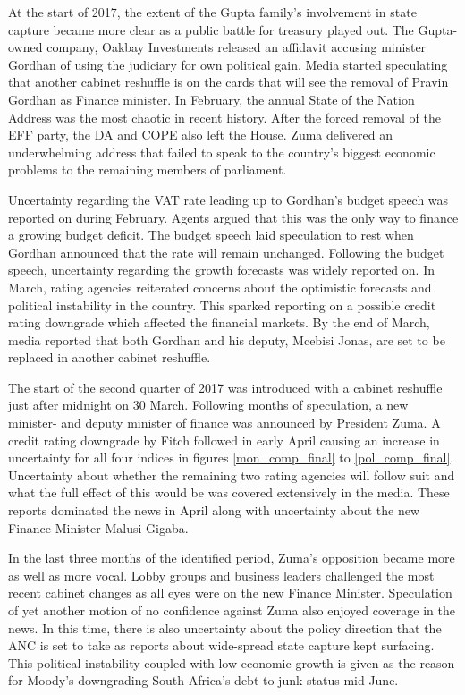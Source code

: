\documentclass[11pt,preprint, authoryear]{elsarticle}
\numberwithin{equation}{section}
\numberwithin{figure}{section}
\numberwithin{table}{section}
\begin{document}
At the start of 2017, the extent of the Gupta family's involvement in
state capture became more clear as a public battle for treasury played
out. The Gupta-owned company, Oakbay Investments released an affidavit
accusing minister Gordhan of using the judiciary for own political gain.
Media started speculating that another cabinet reshuffle is on the cards
that will see the removal of Pravin Gordhan as Finance minister. In
February, the annual State of the Nation Address was the most chaotic in
recent history. After the forced removal of the EFF party, the DA and
COPE also left the House. Zuma delivered an underwhelming address that
failed to speak to the country's biggest economic problems to the
remaining members of parliament.

Uncertainty regarding the VAT rate leading up to Gordhan's budget speech
was reported on during February. Agents argued that this was the only
way to finance a growing budget deficit. The budget speech laid
speculation to rest when Gordhan announced that the rate will remain
unchanged. Following the budget speech, uncertainty regarding the growth
forecasts was widely reported on. In March, rating agencies reiterated
concerns about the optimistic forecasts and political instability in the
country. This sparked reporting on a possible credit rating downgrade
which affected the financial markets. By the end of March, media
reported that both Gordhan and his deputy, Mcebisi Jonas, are set to be
replaced in another cabinet reshuffle.

The start of the second quarter of 2017 was introduced with a cabinet
reshuffle just after midnight on 30 March. Following months of
speculation, a new minister- and deputy minister of finance was
announced by President Zuma. A credit rating downgrade by Fitch followed
in early April causing an increase in uncertainty for all four indices
in figures \ref{mon_comp_final} to \ref{pol_comp_final}. Uncertainty
about whether the remaining two rating agencies will follow suit and
what the full effect of this would be was covered extensively in the
media. These reports dominated the news in April along with uncertainty
about the new Finance Minister Malusi Gigaba.

In the last three months of the identified period, Zuma's opposition
became more as well as more vocal. Lobby groups and business leaders
challenged the most recent cabinet changes as all eyes were on the new
Finance Minister. Speculation of yet another motion of no confidence
against Zuma also enjoyed coverage in the news. In this time, there is
also uncertainty about the policy direction that the ANC is set to take
as reports about wide-spread state capture kept surfacing. This
political instability coupled with low economic growth is given as the
reason for Moody's downgrading South Africa's debt to junk status
mid-June.
\end{document}
